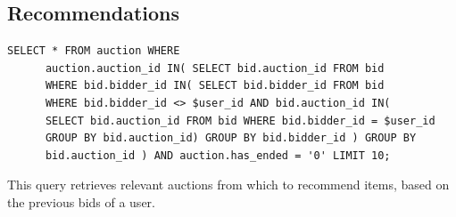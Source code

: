 \documentclass{article}
\begin{document}
\subsection{Recommendations}
\begin{verbatim}
SELECT * FROM auction WHERE
	  auction.auction_id IN( SELECT bid.auction_id FROM bid
	  WHERE bid.bidder_id IN( SELECT bid.bidder_id FROM bid
	  WHERE bid.bidder_id <> $user_id AND bid.auction_id IN(
      SELECT bid.auction_id FROM bid WHERE bid.bidder_id = $user_id
      GROUP BY bid.auction_id) GROUP BY bid.bidder_id ) GROUP BY
	  bid.auction_id ) AND auction.has_ended = '0' LIMIT 10;
\end{verbatim}
This query retrieves relevant auctions from which to recommend items, based on the previous bids of a user.
\end{document}
